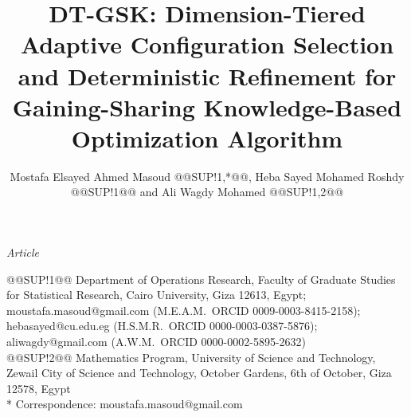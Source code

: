 \documentclass[10pt,a4paper]{article}
\title{DT-GSK: Dimension-Tiered Adaptive Configuration Selection and Deterministic Refinement for Gaining-Sharing Knowledge-Based Optimization Algorithm}
\author{Mostafa Elsayed Ahmed Masoud @@SUP!1,*@@, Heba Sayed Mohamed Roshdy @@SUP!1@@ and Ali Wagdy Mohamed @@SUP!1,2@@}
\date{}
\begin{document}
\noindent\textit{Article}

\maketitle

\begin{center}\footnotesize
@@SUP!1@@ \quad Department of Operations Research, Faculty of Graduate Studies for
Statistical Research, Cairo University, Giza 12613, Egypt;
moustafa.masoud@gmail.com (M.E.A.M.\ ORCID 0009-0003-8415-2158); hebasayed@cu.edu.eg (H.S.M.R.\ ORCID 0000-0003-0387-5876); aliwagdy@gmail.com (A.W.M.\ ORCID 0000-0002-5895-2632)\\
@@SUP!2@@ \quad Mathematics Program, University of Science and Technology,
Zewail City of Science and Technology, October Gardens, 6th of October,
Giza 12578, Egypt\\
* Correspondence: moustafa.masoud@gmail.com
\end{center}
\end{document}
